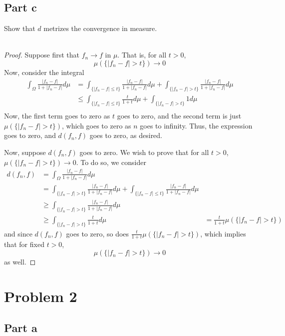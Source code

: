 \documentclass[fontsize=11pt]{scrartcl} %
\numberwithin{equation}{section} %
\numberwithin{figure}{section} %
\numberwithin{table}{section} %
\begin{document}
\subsection*{Part c}
Show that $d$ metrizes the convergence in measure.
\\
\\
\begin{proof}
Suppose first that $f_n\to f$ in $\mu$. That is, for all $t>0$,
    \[
        \mu(\{|f_n-f|>t\})\to 0
    \]
    Now, consider the integral
    \[
        \begin{aligned}
            \int_{\Omega}\frac{|f_n-f|}{1+|f_n-f|}d\mu
            &= \int_{\{|f_n-f|\leq t\}}\frac{|f_n-f|}{1+|f_n-f|}d\mu +
            \int_{\{|f_n-f|>t\}}\frac{|f_n-f|}{1+|f_n-f|}d\mu\\
            &\leq \int_{\{|f_n-f|\leq t\}}\frac{t}{1+t}d\mu +
            \int_{\{|f_n-f|>t\}}1d\mu\\
        \end{aligned}
    \]
    Now, the first term goes to zero as $t$ goes to zero, and the second term
    is just $\mu(\{|f_n-f|>t\})$, which goes to zero as $n$ goes to infinity.
    Thus, the expression goes to zero, and $d(f_n,f)$ goes to zero, as desired.

    Now, suppose $d(f_n,f)$ goes to zero. We wish to prove that for all $t>0$,
    $\mu(\{|f_n-f| > t\})\to 0$. To do so, we consider
    \[
        \begin{aligned}
            d(f_n,f) &= \int_{\Omega}\frac{|f_n-f|}{1+|f_n-f|}d\mu\\
            &= \int_{\{|f_n-f|>t\}}\frac{|f_n-f|}{1+|f_n-f|}d\mu +
                \int_{\{|f_n-f|\leq t\}}\frac{|f_n-f|}{1+|f_n-f|}d\mu\\
            &\geq\int_{\{|f_n-f|>t\}}\frac{|f_n-f|}{1+|f_n-f|}d\mu\\
            &\geq\int_{\{|f_n-f|>t\}}\frac{t}{1+t}d\mu
            &=\frac{t}{1+t}\mu(\{|f_n-f|>t\})
        \end{aligned}
    \]
    and since $d(f_n,f)$ goes to zero, so does
    $\frac{t}{1+t}\mu(\{|f_n-f|>t\})$, which implies that for fixed $t>0$,
    \[
        \mu(\{|f_n-f|>t\})\to 0
    \]
    as well.
\end{proof}

\section*{Problem 2}
\subsection*{Part a}
\end{document}
